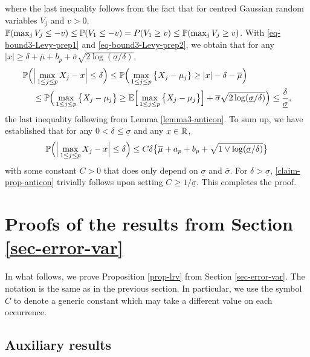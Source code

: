 where the last inequality follows from the fact that for centred Gaussian random variables $V_j$ and $v > 0$, $\mathbb{P}(\max_j V_j \le -v) \le \mathbb{P}(V_1 \le -v) = P(V_1 \ge v) \le \mathbb{P}(\max_j V_j \ge v)$. With \eqref{eq-bound3-Levy-prep1} and \eqref{eq-bound3-Levy-prep2}, we obtain that for any $|x| \ge \delta + \overline{\mu} + b_p + \overline{\sigma}\sqrt{2\log(\underline{\sigma}/\delta)}$,
\begin{align*} 
\mathbb{P} \Big( & \Big| \max_{1 \le j \le p} X_j - x \Big| \le \delta \Big) \le \mathbb{P} \Big( \max_{1 \le j \le p} \big\{ X_j - \mu_j \} \ge |x| - \delta - \overline{\mu} \Big) \\
 & \le \mathbb{P} \Big( \max_{1 \le j \le p} \big\{ X_j - \mu_j \big\} \ge \mathbb{E} \Big[ \max_{1 \le j \le p} \big\{ X_j-\mu_j \big\} \Big] + \overline{\sigma} \sqrt{2\log(\underline{\sigma}/\delta)} \Big) \le \frac{\delta}{\underline{\sigma}}, 
\end{align*}
the last inequality following from Lemma \ref{lemma3-anticon}. To sum up, we have established that for any $0 < \delta \le \underline{\sigma}$ and any $x \in \mathbb{R}$, 
\begin{equation}\label{claim-prop-anticon}
\mathbb{P} \Big( \Big| \max_{1 \le j \le p} X_j - x \Big| \le \delta \Big) \le C \delta \big\{ \overline{\mu} + a_p + b_p + \sqrt{1 \vee \log(\underline{\sigma}/\delta)} \big\} 
\end{equation}
with some constant $C > 0$ that does only depend on $\underline{\sigma}$ and $\overline{\sigma}$. For $\delta > \underline{\sigma}$, \eqref{claim-prop-anticon} trivially follows upon setting $C \ge 1/\underline{\sigma}$. This completes the proof. 



\section{Proofs of the results from Section \ref{sec-error-var}}\label{sec-supp-proofs2}


In what follows, we prove Proposition \ref{prop-lrv} from Section \ref{sec-error-var}. The notation is the same as in the previous section. In particular, we use the symbol $C$ to denote a generic constant which may take a different value on each occurrence. 


\enlargethispage{0.1cm}
\subsection*{Auxiliary results}


